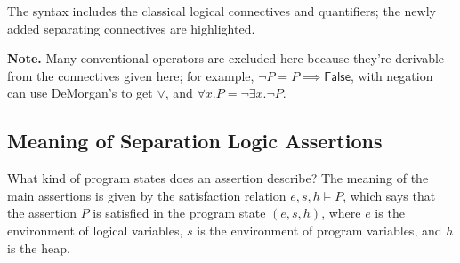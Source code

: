 \documentclass[11pt]{article}
\newcommand{\False}{\mathsf{False}}
\begin{document}
The syntax includes the classical logical connectives and quantifiers; the newly
added separating connectives are highlighted. 

\textbf{Note.} Many conventional operators are excluded here because they're derivable from the connectives given here; for example, $\lnot P = P \implies \False$, with negation can use DeMorgan's to get $\lor$, and $\forall x. P = \lnot \exists x. \lnot P$. 

\subsection{Meaning of Separation Logic Assertions}

What kind of program states does an assertion describe?
The meaning of the main assertions is given by the satisfaction relation $e, s,
h \models P$, which says that the assertion $P$ is satisfied in the program
state $(e, s, h)$, where $e$ is the environment of logical variables, $s$ is the
environment of program variables, and $h$ is the heap.
\end{document}
